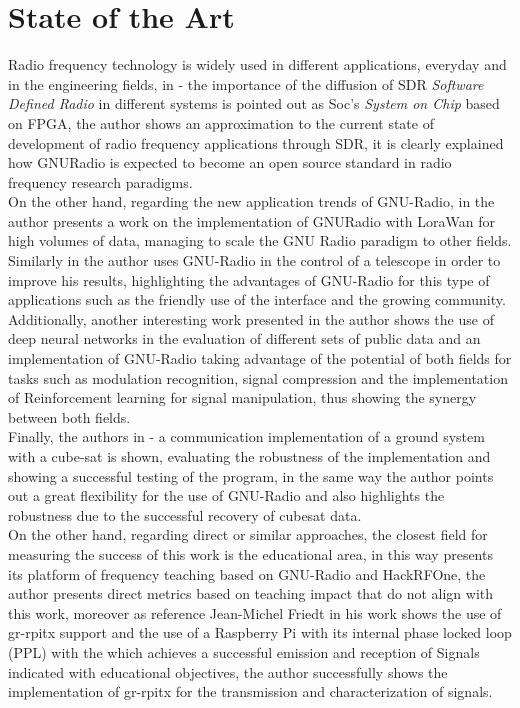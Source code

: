 \documentclass[12pt, twoside]{report}
\begin{document}
\section{State of the Art}
Radio frequency technology is widely used in different applications,  everyday and in the engineering fields, in \cite{Valerio2008}-\cite{Valerio2008a} the importance of the diffusion of SDR \textit{Software Defined Radio} in different systems is pointed out as Soc's \textit{System on Chip} based on FPGA, the author shows an approximation to the current state of development of radio frequency applications through SDR, it is clearly explained how GNURadio is expected to become an open source standard in radio frequency research paradigms.\\
On the other hand, regarding the new application trends of GNU-Radio, in \cite{Lavric2021}  the author presents a work on the implementation of GNURadio with LoraWan for high volumes of data, managing to scale the GNU Radio paradigm to other fields. Similarly in \cite{White2017} the author uses GNU-Radio in the control of a telescope in order to improve his results, highlighting the advantages of GNU-Radio for this type of applications such as the friendly use of the interface and the growing community.\\
Additionally, another interesting work presented in \cite{OShea2016} the author shows the use of deep neural networks in the evaluation of different sets of public data and an implementation of GNU-Radio taking advantage of the potential of both fields for tasks such as modulation recognition, signal compression and the implementation of Reinforcement learning for signal manipulation, thus showing the synergy between both fields.\\
Finally, the authors in \cite{Marshall2021}-\cite{Mladenov2022} a communication implementation of a ground system with a cube-sat is shown, evaluating the robustness of the implementation and showing a successful testing of the program, in the same way the author points out a great flexibility for the use of GNU-Radio and also highlights the robustness due to the successful recovery of cubesat data.\\
On the other hand, regarding direct or similar approaches, the closest field for measuring the success of this work is the educational area, in this way \cite{Zabootny2020} presents its platform of frequency teaching based on GNU-Radio and HackRFOne, the author presents direct metrics based on teaching impact that do not align with this work, moreover as reference Jean-Michel Friedt in his work \cite{Friedt2021}  shows the use of gr-rpitx support and the use of a Raspberry Pi with its internal phase locked loop (PPL) with the which achieves a successful emission and reception of Signals indicated with educational objectives, the author successfully shows the implementation of gr-rpitx for the transmission and characterization of signals.\\
\end{document}
